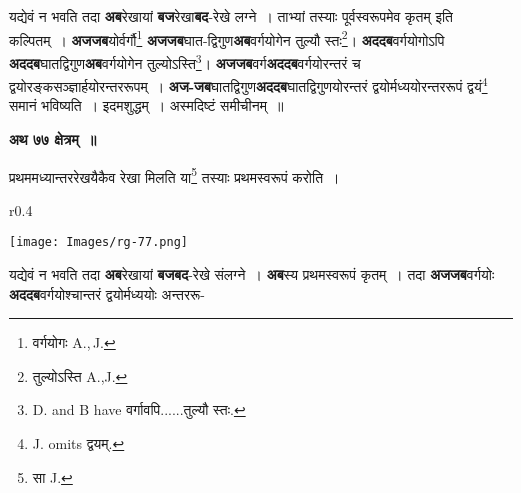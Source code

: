 \documentclass[11pt, openany]{book}
\begin{document}
 यद्येवं न भवति तदा \textbf{अब}रेखायां \textbf{बज}रेखा\textbf{बद}-रेखे लग्ने~। ताभ्यां तस्याः पूर्वस्वरूपमेव कृतम् इति कल्पितम्~। \textbf{अजजब}योर्वर्गौ\renewcommand{\thefootnote}{२}\footnote{वर्गयोगः {\en A.,\,J.}} \textbf{अजजब}घात-द्विगुण\textbf{अब}वर्गयोगेन तुल्यौ स्तः\renewcommand{\thefootnote}{३}\footnote{तुल्योऽस्ति {\en A.,J.}}\;। \textbf{अददब}वर्गयोगोऽपि \textbf{अददब}घातद्विगुण\textbf{अब}वर्गयोगेन तुल्योऽस्ति\renewcommand{\thefootnote}{४}\footnote{{\en D. and B have} वर्गावपि......तुल्यौ स्तः.}\;। \textbf{अजजब}वर्ग\textbf{अददब}वर्गयोरन्तरं च द्वयोरङ्कसञ्ज्ञार्हयोरन्तररूपम्~। \textbf{अज-जब}घातद्विगुण\textbf{अददब}घातद्विगुणयोरन्तरं द्वयोर्मध्ययोरन्तररूपं द्वयं\renewcommand{\thefootnote}{५}\footnote{{\en J. omits} द्वयम्.} समानं भविष्यति~। इदमशुद्धम्~। अस्मदिष्टं समीचीनम्~॥ 
\vspace{2mm}
 
\begin{center}
\textbf{\large  अथ ७७ क्षेत्रम्~॥}
\end{center}

 {\ab प्रथममध्यान्तररेखयैकैव रेखा मिलति या\renewcommand{\thefootnote}{६}\footnote{सा {\en J.}} तस्याः प्रथमस्वरूपं करोति~। }\\

\begin{wrapfigure}{r}{0.4\textwidth}
\vspace{-10mm}
\begin{flushright}
\texttt{[image: Images/rg-77.png]}
\end{flushright}
\vspace{-8mm}
\end{wrapfigure}

 यद्येवं न भवति तदा \textbf{अब}रेखायां \textbf{बजबद}-रेखे संलग्ने~। \textbf{अब}स्य प्रथमस्वरूपं कृतम्~। तदा \textbf{अजजब}वर्गयोः \textbf{अददब}वर्गयोश्चान्तरं द्वयोर्मध्ययोः अन्तररू-
\end{document}
